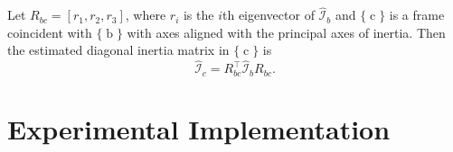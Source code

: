 \documentclass[letterpaper, 10 pt, journal, twoside]{IEEEtran}
\newcommand{\mass}{{\mathfrak{m}}}
\newcommand{\inertia}{{\mathcal{I}}}
\newcommand{\framec}{\operatorname{c}}
\newcommand{\frameb}{\operatorname{b}}
\begin{document}
Let $R_{bc} = [r_1, r_2, r_3]$, where $r_i$ is the $i$th eigenvector of $\hat{\inertia}_b$ and $\{\framec\}$ is a frame coincident with $\{\frameb\}$ with axes aligned with the principal axes of inertia. Then the estimated diagonal inertia matrix in $\{\framec\}$ is 
\begin{equation}
    \hat{\inertia}_c = R_{bc}^\intercal \hat{\inertia}_b R_{bc}
.\end{equation}

\begin{comment}
    
an inertia matrix $\inertia_c$ in a frame aligned with the principal axes of inertia
To find the orientation $R_{bc}$ of a $\{\framec\}$ aligned with the principal axes of inertia, we use the matrix diagonalization
\begin{equation}
    \inertia_b = R_{bc} \Theta R_{bc}^{-1}
\end{equation}
where rotation matrix $R_{bc} = [r_1,r_2,r_3]$, $r_i$ is the $i$th eigenvector of $\inertia_b'$. The inertia matrix $\inertia_c$ represented in frame $\{\framec\}$ can be given as 
\begin{equation}
    \inertia_c = R_{bc}^\intercal \inertia_b R_{bc}
.\end{equation}

Additionally, to describe an inertia matrix $\inertia_d$ about a frame aligned with $\{\framec\}$ but positioned at $d = (d_x, d_y, d_z)$ in $\{\framec\}$, the relationship can be expressed through the parallel axis theorem~\cite{lynch2017} by
\begin{equation}
    \inertia_d = \inertia_c + \mass(d^\intercal d I_3 - d d^\intercal)
\end{equation}
where $\mass$ is the mass of the object and $I_3$ is the $3 \times 3$ identity matrix.

At this point, with $p_{sc}$ from the center of mass estimation and $R_{bc}$ from the inertia matrix estimation, along with $R_{sb} = I$, the transformation matrix $T_{sc}$ could be constructed.
\end{comment}

\section{Experimental Implementation}
\end{document}
